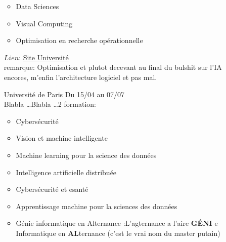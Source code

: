 \documentclass[a4paper,11pt]{article}
\begin{document}
\begin{enumerate}
\begin{itemize}
                    \item Data Sciences
                    \item Visual Computing
                    \item Optimisation en recherche opérationnelle
                \end{itemize}
                $Lien$: \href{https://sciences-techniques.univ-nantes.fr/formations/masters/master-informatique}{Site Université}
                \\remarque: Optimisation et plutot decevant au final du bulshit sur l'IA encores, m'enfin l'architecture logiciel et pas mal.
\\
        \item [\color{LightOrangeHaf}Université de Paris] Du 15/04 au 07/07
                \\Blabla \ldots Blabla \dots 2 formation:
                \begin{itemize}
                    \item Cybersécurité
                    \item Vision et machine intelligente
                    \item Machine learning pour la science des données
                    \item Intelligence artificielle distribuée
                    \item Cybersécurité et esanté
                    \item Apprentissage machine pour la sciences des données
                    \item Génie informatique en Alternance
                    :L'agternance a l'aire \textbf{G\'{E}NI} e Informatique en \textbf{AL}ternance (c'est le vrai nom du master putain) 
                \end{itemize}
    \end{enumerate}
\end{document}
